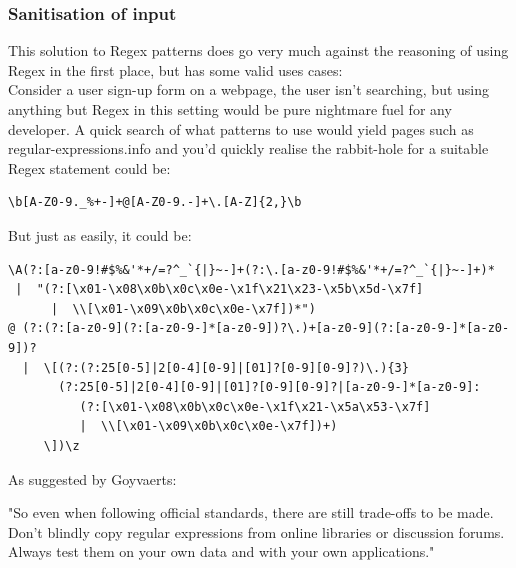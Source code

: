 \documentclass{IEEEtran}
\begin{document}
            \subsubsection{Sanitisation of input}
                This solution to Regex patterns does go very much against the reasoning of 
                using Regex in the first place, but has some valid uses cases:\\
                Consider a user sign-up form on a webpage, the user isn't searching, but 
                using anything but Regex in this setting would be pure nightmare fuel for 
                any developer. A quick search of what patterns to use would yield pages such as
                regular-expressions.info\cite{RegularExpressions.info} and you'd quickly realise
                the rabbit-hole for a suitable Regex statement could be:

                \begin{verbatim}
\b[A-Z0-9._%+-]+@[A-Z0-9.-]+\.[A-Z]{2,}\b
                \end{verbatim}

                But just as easily, it could be: 

                \begin{verbatim}
\A(?:[a-z0-9!#$%&'*+/=?^_`{|}~-]+(?:\.[a-z0-9!#$%&'*+/=?^_`{|}~-]+)*
 |  "(?:[\x01-\x08\x0b\x0c\x0e-\x1f\x21\x23-\x5b\x5d-\x7f]
      |  \\[\x01-\x09\x0b\x0c\x0e-\x7f])*")
@ (?:(?:[a-z0-9](?:[a-z0-9-]*[a-z0-9])?\.)+[a-z0-9](?:[a-z0-9-]*[a-z0-9])?
  |  \[(?:(?:25[0-5]|2[0-4][0-9]|[01]?[0-9][0-9]?)\.){3}
       (?:25[0-5]|2[0-4][0-9]|[01]?[0-9][0-9]?|[a-z0-9-]*[a-z0-9]:
          (?:[\x01-\x08\x0b\x0c\x0e-\x1f\x21-\x5a\x53-\x7f]
          |  \\[\x01-\x09\x0b\x0c\x0e-\x7f])+)
     \])\z
                \end{verbatim}
                As suggested by Goyvaerts\cite{RegularExpressions.info}:
                \begin{displayquote}
                    "So even when following official standards, there are still trade-offs to be made. Don't blindly copy regular expressions from online libraries or discussion forums. Always test them on your own data and with your own applications."
                \end{displayquote}
\end{document}

